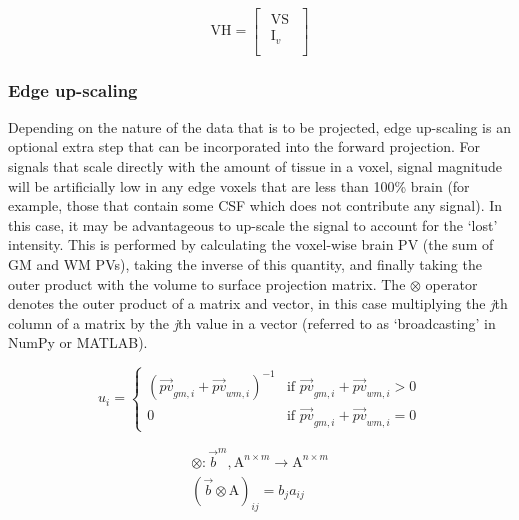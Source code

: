 \begin{equation}
\mathrm{VH} =  \begin{bmatrix}
    \begin{array}{c}
  \mathrm{VS}  \\
  \hline
  \mathrm{I}_v \\
    \end{array}
  \end{bmatrix}
\end{equation}

\subsubsection{Edge up-scaling}

Depending on the nature of the data that is to be projected, edge up-scaling is an optional extra step that can be incorporated into the forward projection. For signals that scale directly with the amount of tissue in a voxel, signal magnitude will be artificially low in any edge voxels that are less than 100\% brain (for example, those that contain some CSF which does not contribute any signal). In this case, it may be advantageous to up-scale the signal to account for the `lost' intensity. This is performed by calculating the voxel-wise brain PV (the sum of GM and WM PVs), taking the inverse of this quantity, and finally taking the outer product with the volume to surface projection matrix. The $\otimes$ operator denotes the outer product of a matrix and vector, in this case multiplying the \textit{j}th column of a matrix by the \textit{j}th value in a vector (referred to as `broadcasting' in NumPy or MATLAB). 

\begin{equation}
u_{i} = 
\begin{cases}
(\vec{pv}_{gm,i} + \vec{pv}_{wm,i})^{-1} & \text{if } \vec{pv}_{gm,i} + \vec{pv}_{wm,i} > 0 \\ 
0 & \text{if } \vec{pv}_{gm,i} + \vec{pv}_{wm,i} = 0 
\end{cases}
\end{equation}

\begin{equation}
\begin{aligned}
\otimes : \vec{b}^m, \mathrm{A}^{n \times m} \rightarrow \mathrm{A}^{n \times m} \\
(\vec{b} \otimes \mathrm{A})_{ij} = b_{j} a_{ij} 
\end{aligned}
\end{equation}

